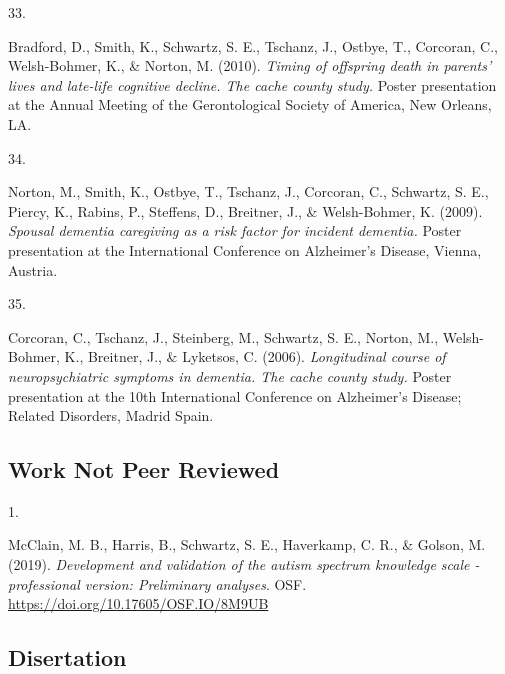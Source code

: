 \documentclass[11pt,a4paper,]{moderncv}
\newlength{\csllabelwidth}
\newcommand{\CSLLeftMargin}[1]{\parbox[t]{\csllabelwidth}{#1}}
\newcommand{\CSLRightInline}[1]{\parbox[t]{\linewidth - \csllabelwidth}{#1}}
\begin{document}
\leavevmode{}%
\CSLLeftMargin{33. }
\CSLRightInline{Bradford, D., Smith, K., Schwartz, S. E., Tschanz, J.,
Ostbye, T., Corcoran, C., Welsh-Bohmer, K., \& Norton, M. (2010).
\emph{Timing of offspring death in parents' lives and late-life
cognitive decline. The cache county study.} Poster presentation at the
Annual Meeting of the Gerontological Society of America, New Orleans,
LA.}

\leavevmode{}%
\CSLLeftMargin{34. }
\CSLRightInline{Norton, M., Smith, K., Ostbye, T., Tschanz, J.,
Corcoran, C., Schwartz, S. E., Piercy, K., Rabins, P., Steffens, D.,
Breitner, J., \& Welsh-Bohmer, K. (2009). \emph{Spousal dementia
caregiving as a risk factor for incident dementia.} Poster presentation
at the International Conference on Alzheimer's Disease, Vienna,
Austria.}

\leavevmode{}%
\CSLLeftMargin{35. }
\CSLRightInline{Corcoran, C., Tschanz, J., Steinberg, M., Schwartz, S.
E., Norton, M., Welsh-Bohmer, K., Breitner, J., \& Lyketsos, C. (2006).
\emph{Longitudinal course of neuropsychiatric symptoms in dementia. The
cache county study.} Poster presentation at the 10th International
Conference on Alzheimer's Disease; Related Disorders, Madrid Spain.}

\vspace{7mm}

\hypertarget{work-not-peer-reviewed}{%
\subsection{\texorpdfstring{\textbf{Work Not Peer
Reviewed}}{Work Not Peer Reviewed}}\label{work-not-peer-reviewed}}

\hypertarget{refs_notpeer}{}
\leavevmode{}%
\CSLLeftMargin{1. }
\CSLRightInline{McClain, M. B., Harris, B., Schwartz, S. E., Haverkamp,
C. R., \& Golson, M. (2019). \emph{Development and validation of the
autism spectrum knowledge scale - professional version: Preliminary
analyses}. OSF. \url{https://doi.org/10.17605/OSF.IO/8M9UB}}

\clearpage

\vspace{7mm}

\hypertarget{disertation}{%
\subsection{\texorpdfstring{\textbf{Disertation}}{Disertation}}\label{disertation}}
\end{document}
